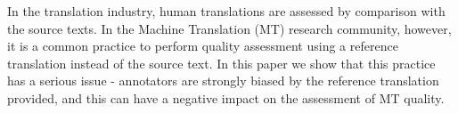 In the translation industry, human translations are assessed by comparison with the source texts. In the Machine Translation (MT) research community, however, it is a common practice to perform quality assessment using a reference translation instead of the source text. In this paper we show that this practice has a serious issue - annotators are strongly biased by the reference translation provided, and this can have a negative impact on the assessment of MT quality.

